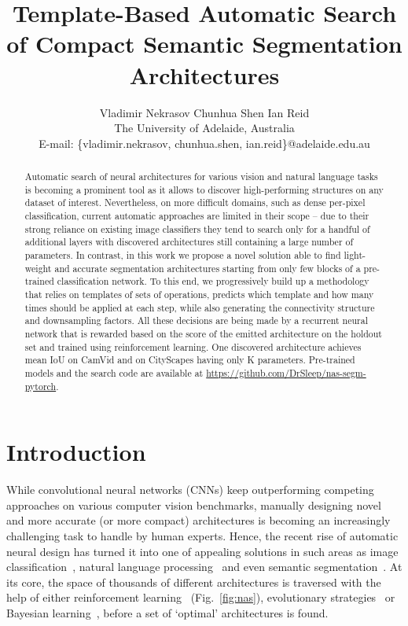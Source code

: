 \documentclass[10pt,twocolumn,letterpaper]{article}
\begin{document}
\title{Template-Based Automatic Search of Compact Semantic Segmentation Architectures}

\author{Vladimir Nekrasov
\quad
Chunhua Shen
\quad
Ian Reid \\
The University of Adelaide, Australia\\
{
 \small
 E-mail:
 \{vladimir.nekrasov, chunhua.shen, ian.reid\}@adelaide.edu.au 
}
}

\maketitle
\ifwacvfinal\thispagestyle{empty}\fi


\begin{abstract}
	Automatic search of neural architectures for various vision and natural language tasks is becoming a prominent tool as it allows to discover high-performing structures on any dataset of interest. Nevertheless, on more difficult domains, such as dense per-pixel classification, current automatic approaches are limited in their scope -- due to their strong reliance on existing image classifiers they tend to search only for a handful of additional layers with discovered architectures still containing a large number of parameters. In contrast, in this work we propose a novel solution able to find light-weight and accurate segmentation architectures starting from only few blocks of a pre-trained classification network. To this end, we progressively build up a methodology that relies on templates of sets of operations, predicts which template and how many times should be applied at each step, while also generating the connectivity structure and downsampling factors. All these decisions are being made by a recurrent neural network that is rewarded based on the score of the emitted architecture on the holdout set and trained using reinforcement learning. One discovered architecture achieves  mean IoU on CamVid and  on CityScapes having only K parameters. Pre-trained models and the search code are available at \url{https://github.com/DrSleep/nas-segm-pytorch}.
	\vskip -0.25in
\end{abstract}

\section{Introduction}

While convolutional neural networks (CNNs) keep outperforming competing approaches on various computer vision benchmarks, manually designing novel and more accurate (or more compact) architectures is becoming an increasingly challenging task to handle by human experts. Hence, the recent rise of automatic neural design has turned it into one of appealing solutions in such areas as image classification~\cite{ZophL16}, natural language processing~\cite{ZophVSL17} and even semantic segmentation~\cite{abs-1809-04184}. At its core, the space of thousands of different architectures is traversed with the help of either reinforcement learning~\cite{ZophL16} (Fig.~\ref{fig:nas}), evolutionary strategies~\cite{RealMSSSTLK17} or Bayesian learning~\cite{KandasamyNSPX18}, before a set of `optimal' architectures is found.
\end{document}
